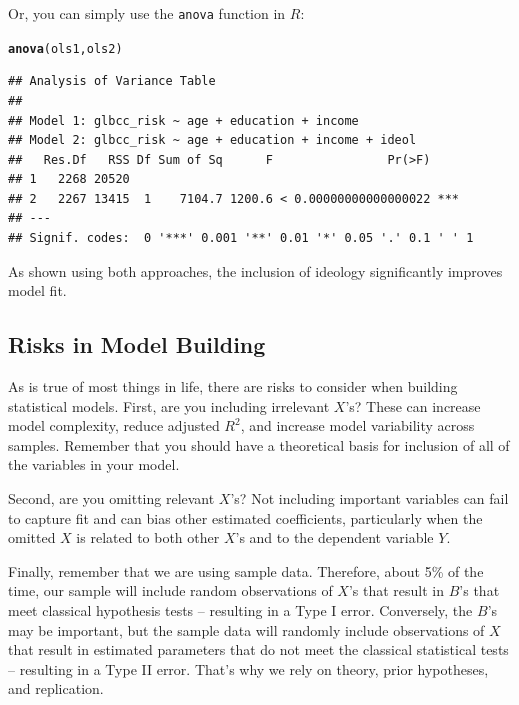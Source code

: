 \documentclass[11pt,openany]{book}\usepackage[]{graphicx}\usepackage[]{color}
\makeatletter
\newcommand{\hlstd}[1]{\textcolor[rgb]{0.345,0.345,0.345}{#1}}%
\newcommand{\hlkwd}[1]{\textcolor[rgb]{0.737,0.353,0.396}{\textbf{#1}}}%
\newenvironment{kframe}{%
 \def\at@end@of@kframe{}%
 \ifinner\ifhmode%
  \def\at@end@of@kframe{\end{minipage}}%
  \begin{minipage}{\columnwidth}%
 \fi\fi%
 \def\FrameCommand##1{\hskip\@totalleftmargin \hskip-\fboxsep
 \colorbox{shadecolor}{##1}\hskip-\fboxsep
     \hskip-\linewidth \hskip-\@totalleftmargin \hskip\columnwidth}%
 \MakeFramed {\advance\hsize-\width
   \@totalleftmargin\z@ \linewidth\hsize
   \@setminipage}}%
 {\par\unskip\endMakeFramed%
 \at@end@of@kframe}
\newenvironment{knitrout}{}{} %
\renewenvironment{knitrout}{\begin{singlespace}}{\end{singlespace}}
\makeatother
\begin{document}
Or, you can simply use the \texttt{anova} function in $R$: 
\begin{knitrout}
\color{fgcolor}\begin{kframe}
\begin{alltt}
\hlkwd{anova}\hlstd{(ols1, ols2)}
\end{alltt}
\begin{verbatim}
## Analysis of Variance Table
## 
## Model 1: glbcc_risk ~ age + education + income
## Model 2: glbcc_risk ~ age + education + income + ideol
##   Res.Df   RSS Df Sum of Sq      F                Pr(>F)    
## 1   2268 20520                                              
## 2   2267 13415  1    7104.7 1200.6 < 0.00000000000000022 ***
## ---
## Signif. codes:  0 '***' 0.001 '**' 0.01 '*' 0.05 '.' 0.1 ' ' 1
\end{verbatim}
\end{kframe}
\end{knitrout}

\noindent As shown using both approaches, the inclusion of ideology significantly improves model fit. 

\subsection{Risks in Model Building}

As is true of most things in life, there are risks to consider when building statistical models. First, are you including irrelevant $X$'s? These can increase model complexity, reduce adjusted $R^2$, and  increase model variability across samples. Remember that you should have a theoretical basis for inclusion of all of the variables in your model. 

Second, are you omitting relevant $X$'s? Not including important variables can fail to capture fit and can bias other estimated coefficients, particularly when the omitted $X$ is related to both other $X$'s and to the dependent variable $Y$. 

Finally, remember that we are using sample data. Therefore, about 5\% of the time, our sample will include random observations of $X$'s that result in $B$'s that meet classical hypothesis tests -- resulting in a Type I error. Conversely, the $B$'s may be important, but the sample data will randomly include observations of $X$ that result in estimated parameters that do not meet  the classical statistical tests -- resulting in a Type II error.  That's why we rely on theory, prior hypotheses, and replication. 
\end{document}
